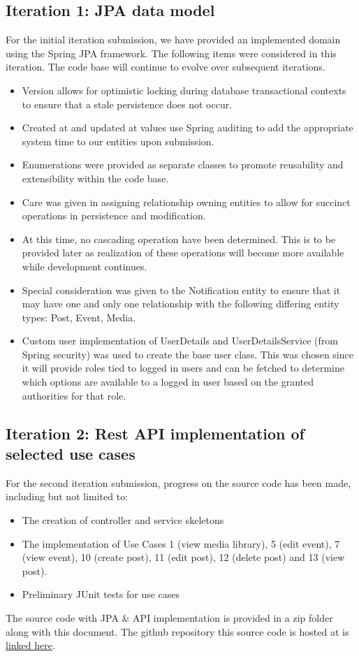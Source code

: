 \subsection{Iteration 1: JPA data model}
For the initial iteration submission, we have provided an implemented domain using the
Spring JPA framework. The following items were considered in this iteration. The code base will continue to evolve over subsequent iterations.
\begin{itemize}
    \item Version allows for optimistic locking during database transactional contexts to ensure that a stale persistence does not occur.

    \item Created at and updated at values use Spring auditing to add the appropriate system time to our entities upon submission.

    \item Enumerations were provided as separate classes to promote reusability and extensibility within the code base.

    \item Care was given in assigning relationship owning entities to allow for succinct operations in persistence and modification.

    \item At this time, no cascading operation have been determined. This is to be provided later as realization of these operations will become more available while development continues.

    \item Special consideration was given to the Notification entity to ensure that it may have one and only one relationship with the following differing entity types: Post, Event, Media.

    \item Custom user implementation of UserDetails and UserDetailsService (from Spring security) was used to create the base user class. This was chosen since it will provide roles tied to logged in users and can be fetched to determine which options are available to a logged in user based on the granted authorities for that role.
\end{itemize}

\subsection{Iteration 2: Rest API implementation of selected use cases}
For the second iteration submission, progress on the source code has been made, including but not limited to:
\begin{itemize}
    \item The creation of controller and service skeletons
    \item The implementation of Use Cases 1 (view media library), 5 (edit event), 7 (view event), 10 (create post), 11 (edit post), 12 (delete post) and 13 (view post).
    \item Preliminary JUnit tests for use cases
\end{itemize}

The source code with JPA \& API implementation is provided in a zip folder along with this document. The github repository this source code is hosted at is \href{https://github.com/tkm3d1a/cs5324_s24_class_project}{linked here}.
